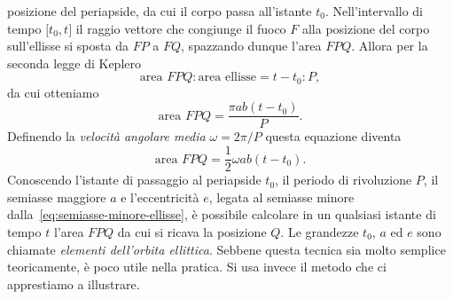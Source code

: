 posizione del periapside, da cui il corpo passa all'istante
$t_0$. Nell'intervallo di tempo $\mathopen{[}t_0, t\mathclose{]}$ il raggio
vettore che congiunge il fuoco $F$ alla posizione del corpo sull'ellisse si
sposta da $FP$ a $FQ$, spazzando dunque l'area $FPQ$. Allora per la seconda
legge di Keplero
\begin{equation}
  \text{area } FPQ : \text{area ellisse} = t-t_0 : P,
\end{equation}
da cui otteniamo
\begin{equation}
  \text{area } FPQ = \frac{\pi ab(t-t_0)}{P}.
\end{equation}
Definendo la \emph{velocità angolare media} $\omega = 2\pi/P$ questa equazione
diventa
\begin{equation}
  \text{area } FPQ = \frac{1}{2}\omega ab(t-t_0).
\end{equation}
Conoscendo l'istante di passaggio al periapside $t_0$, il periodo di rivoluzione
$P$, il semiasse maggiore $a$ e l'eccentricità $e$, legata al semiasse minore
dalla~\eqref{eq:semiasse-minore-ellisse}, è possibile calcolare in un qualsiasi
istante di tempo $t$ l'area $FPQ$ da cui si ricava la posizione $Q$. Le
grandezze $t_0$, $a$ ed $e$ sono chiamate \emph{elementi dell'orbita
  ellittica}. Sebbene questa tecnica sia molto semplice teoricamente, è poco
utile nella pratica. Si usa invece il metodo che ci apprestiamo a illustrare.

